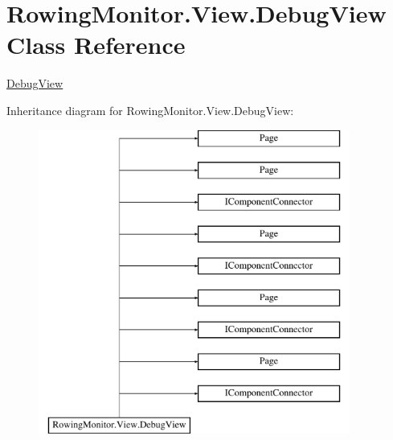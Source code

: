 \hypertarget{class_rowing_monitor_1_1_view_1_1_debug_view}{}\section{Rowing\+Monitor.\+View.\+Debug\+View Class Reference}
\label{class_rowing_monitor_1_1_view_1_1_debug_view}


\hyperlink{class_rowing_monitor_1_1_view_1_1_debug_view}{Debug\+View}  


Inheritance diagram for Rowing\+Monitor.\+View.\+Debug\+View\+:\begin{figure}[H]
\begin{center}
\leavevmode
\includegraphics[height=10.000000cm]{class_rowing_monitor_1_1_view_1_1_debug_view}
\end{center}
\end{figure}
